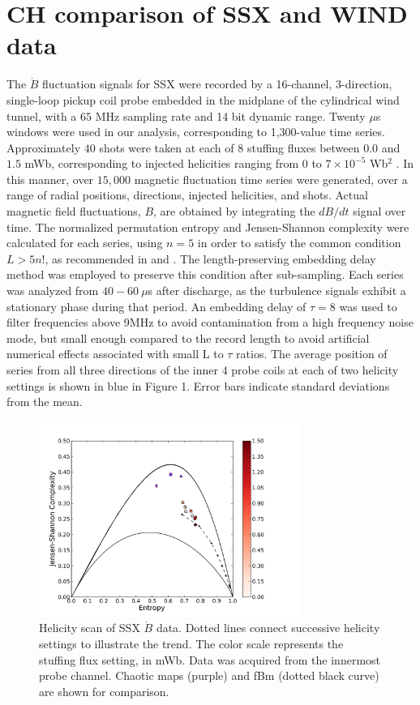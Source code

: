 \documentclass[aps,pre,twocolumn,secnumarabic,nobalancelastpage,amsmath,amssymb,
nofootinbib]{revtex4-1}
\begin{document}
\section{CH comparison of SSX and WIND data}
The $\dot{B}$ fluctuation signals for SSX  were recorded by a 16-channel, 3-direction, single-loop pickup coil probe embedded in the midplane of the cylindrical wind tunnel, with a $65$ MHz sampling rate and 14 bit dynamic range. Twenty $\mu$s windows were used in our analysis, corresponding to 1,300-value time series. Approximately $40$ shots were taken at each of $8$ stuffing fluxes between $0.0$ and $1.5$ mWb, corresponding to injected helicities ranging from $0$ to $7 \times 10^{-5}$ Wb$^2$ \cite{schaffner2014}. In this manner, over $15,000$ magnetic fluctuation time series were generated, over a range of radial positions, directions, injected helicities, and shots. Actual magnetic field fluctuations, $B$, are obtained by integrating the $dB/dt$ signal over time. The normalized permutation entropy and Jensen-Shannon complexity were calculated for each series, using $n=5$ in order to satisfy the common condition $L > 5n!$, as recommended in \cite{amigo2008} and \cite{riedl2013}. The length-preserving embedding delay method was employed to preserve this condition after sub-sampling. Each series was analyzed from $40-60~\mu$s after discharge, as the turbulence signals exhibit a stationary phase during that period. An embedding delay of $\tau=8$ was used to filter frequencies above 9MHz to avoid contamination from a high frequency noise mode, but small enough compared to the record length to avoid artificial numerical effects associated with small L to $\tau$ ratios. The average position of series from all three directions of the inner $4$ probe coils at each of two helicity settings is shown in blue in Figure 1. Error bars indicate standard deviations from the mean.  

\begin{figure}[!htbp]
\centerline{
\includegraphics[width=8.5cm]{fig2.png}}
\caption{\label{fig:helscan} Helicity scan of SSX $\dot{B}$ data. Dotted lines connect successive helicity settings to illustrate the trend. The color scale represents the stuffing flux setting, in mWb.  Data was acquired from the innermost probe channel. Chaotic maps (purple) and fBm (dotted black curve) are shown for comparison.}
\end{figure}
\end{document}
